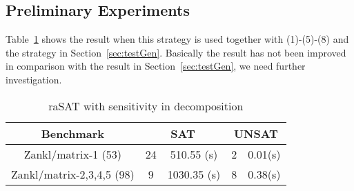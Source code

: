 \subsection*{Preliminary Experiments}
Table~\ref{tab:senInDec} shows the result when this strategy is used together with (1)-(5)-(8) and the strategy in Section~\ref{sec:testGen}. Basically the result has not been improved in comparison with the result in Section~\ref{sec:testGen}, we need further investigation.
\begin{table} \label{tab:senInDec}
\begin{center}
\begin{tabular}{| c | c | c | c | c |}
\hline
Benchmark & \multicolumn{2}{|c|}{SAT} & \multicolumn{2}{c|}{UNSAT}\\ \hline
Zankl/matrix-1 (53) & 24 & 510.55 (s) & 2 & 0.01(s) \\ \hline
Zankl/matrix-2,3,4,5 (98) & 9 & 1030.35 (s) & 8 & 0.38(s) \\ \hline
\end{tabular}
\end{center}
\caption{raSAT with sensitivity in decomposition}
\end{table}


